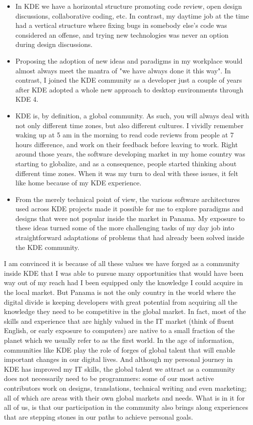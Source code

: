 \begin{itemize}
\item In KDE we have a horizontal structure promoting code review,
  open design discussions, collaborative coding, etc. In contrast, my
  daytime job at the time had a vertical structure where fixing bugs
  in somebody else's code was considered an offense, and trying new
  technologies was never an option during design discussions.
\item Proposing the adoption of new ideas and paradigms in my
  workplace would almost always meet the mantra of "we have always
  done it this way". In contrast, I joined the KDE community as a
  developer just a couple of years after KDE adopted a whole new
  approach to desktop environments through KDE 4.
\item KDE is, by definition, a global community. As such, you will
  always deal with not only different time zones, but also different
  cultures. I vividly remember waking up at 5 am in the morning to
  read code reviews from people at 7 hours difference, and work on
  their feedback before leaving to work. Right around those years, the
  software developing market in my home country was starting to
  globalize, and as a consequence, people started thinking about
  different time zones. When it was my turn to deal with these issues,
  it felt like home because of my KDE experience.
\item From the merely technical point of view, the various software
  architectures used across KDE projects made it possible for me to
  explore paradigms and designs that were not popular inside the
  market in Panama. My exposure to these ideas turned some of the more
  challenging tasks of my day job into straightforward adaptations of
  problems that had already been solved inside the KDE community.
\end{itemize}

I am convinced it is because of all these values we have forged
as a community inside KDE that I was able to pursue many opportunities
that would have been way out of my reach had I been equipped only the
knowledge I could acquire in the local market. But Panama is not the
only country in the world where the digital divide is keeping
developers with great potential from acquiring all the knowledge they
need to be competitive in the global market. In fact, most of the
skills and experience that are highly valued in the IT market (think
of fluent English, or early exposure to computers) are native to a
small fraction of the planet which we usually refer to as the first
world. In the age of information, communities like KDE play the role
of forges of global talent that will enable important changes in our
digital lives. And although my personal journey in KDE has improved my
IT skills, the global talent we attract as a community does not
necessarily need to be programmers: some of our most active
contributors work on designs, translations, technical writing and even
marketing; all of which are areas with their own global markets and
needs. What is in it for all of us, is that our participation in the
community also brings along experiences that are stepping stones in
our paths to achieve personal goals.

